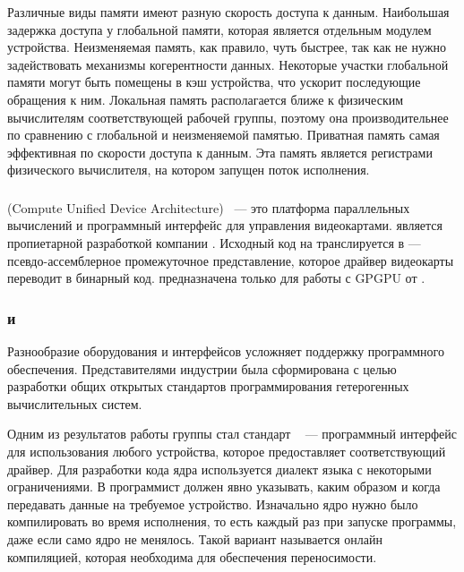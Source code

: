 Различные виды памяти имеют разную скорость доступа к данным.
Наибольшая задержка доступа у глобальной памяти, которая является отдельным модулем устройства.
Неизменяемая память, как правило, чуть быстрее, так как не нужно задействовать
механизмы когерентности данных.
Некоторые участки глобальной памяти могут быть помещены в кэш устройства, что ускорит последующие обращения к ним.
Локальная память располагается ближе к физическим вычислителям соответствующей 
рабочей группы, поэтому она производительнее по сравнению с глобальной и 
неизменяемой памятью.
Приватная память самая эффективная по скорости доступа к данным.
Эта память является регистрами физического вычислителя, на котором запущен 
поток исполнения.

\subsubsection{}
 (Compute Unified Device Architecture)~\cite{CUDA} --- 
это платформа параллельных вычислений и программный интерфейс 
для управления видеокартами.
 является пропиетарной разработкой компании .
Исходный код на  транслируется в  ---
псевдо-ассемблерное промежуточное представление, 
которое драйвер видеокарты переводит в бинарный код.
 предназначена только для работы с GPGPU от .

\subsubsection{ и }
Разнообразие оборудования и интерфейсов усложняет поддержку
программного обеспечения.
Представителями индустрии была сформирована  с целью
разработки общих открытых стандартов программирования гетерогенных
вычислительных систем.

Одним из результатов работы группы стал стандарт 
~\cite{OpenCL} --- программный интерфейс для использования любого
устройства, которое предоставляет соответствующий драйвер.
Для разработки кода ядра используется диалект
языка  с некоторыми ограничениями.
В  программист должен явно указывать, каким образом и когда
передавать данные на требуемое устройство.
Изначально ядро нужно было компилировать во время исполнения, 
то есть каждый раз при запуске программы, даже если само ядро не менялось.
Такой вариант называется онлайн компиляцией, которая необходима для 
обеспечения переносимости.

